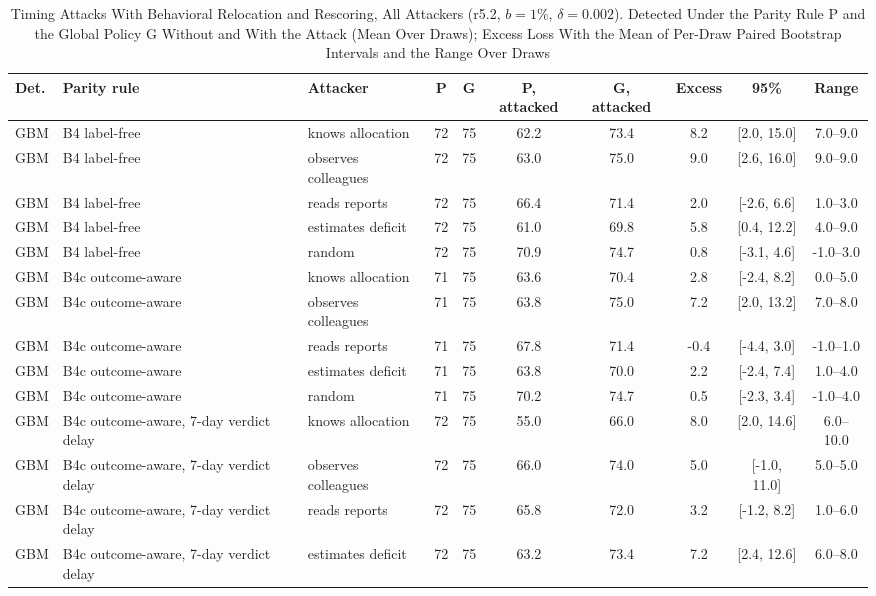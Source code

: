 \documentclass[10pt,onecolumn,letterpaper]{article}
\begin{document}
\begin{table}[!t]
\caption{Timing Attacks With Behavioral Relocation and Rescoring, All Attackers (r5.2, $b=1\%$, $\delta=0.002$). Detected Under the Parity Rule P and the Global Policy G Without and With the Attack (Mean Over Draws); Excess Loss With the Mean of Per-Draw Paired Bootstrap Intervals and the Range Over Draws\label{tab:e-l1-r52}}
\centering
\scriptsize
\setlength{\tabcolsep}{3pt}
\begin{tabular}{lllccccccc}
\toprule
Det. & Parity rule & Attacker & P & G & P, attacked & G, attacked & Excess & 95\% & Range \\
\midrule
GBM & B4 label-free & knows allocation & 72 & 75 & 62.2 & 73.4 & 8.2 & [2.0, 15.0] & 7.0--9.0 \\
GBM & B4 label-free & observes colleagues & 72 & 75 & 63.0 & 75.0 & 9.0 & [2.6, 16.0] & 9.0--9.0 \\
GBM & B4 label-free & reads reports & 72 & 75 & 66.4 & 71.4 & 2.0 & [-2.6, 6.6] & 1.0--3.0 \\
GBM & B4 label-free & estimates deficit & 72 & 75 & 61.0 & 69.8 & 5.8 & [0.4, 12.2] & 4.0--9.0 \\
GBM & B4 label-free & random & 72 & 75 & 70.9 & 74.7 & 0.8 & [-3.1, 4.6] & -1.0--3.0 \\
GBM & B4c outcome-aware & knows allocation & 71 & 75 & 63.6 & 70.4 & 2.8 & [-2.4, 8.2] & 0.0--5.0 \\
GBM & B4c outcome-aware & observes colleagues & 71 & 75 & 63.8 & 75.0 & 7.2 & [2.0, 13.2] & 7.0--8.0 \\
GBM & B4c outcome-aware & reads reports & 71 & 75 & 67.8 & 71.4 & -0.4 & [-4.4, 3.0] & -1.0--1.0 \\
GBM & B4c outcome-aware & estimates deficit & 71 & 75 & 63.8 & 70.0 & 2.2 & [-2.4, 7.4] & 1.0--4.0 \\
GBM & B4c outcome-aware & random & 71 & 75 & 70.2 & 74.7 & 0.5 & [-2.3, 3.4] & -1.0--4.0 \\
GBM & B4c outcome-aware, 7-day verdict delay & knows allocation & 72 & 75 & 55.0 & 66.0 & 8.0 & [2.0, 14.6] & 6.0--10.0 \\
GBM & B4c outcome-aware, 7-day verdict delay & observes colleagues & 72 & 75 & 66.0 & 74.0 & 5.0 & [-1.0, 11.0] & 5.0--5.0 \\
GBM & B4c outcome-aware, 7-day verdict delay & reads reports & 72 & 75 & 65.8 & 72.0 & 3.2 & [-1.2, 8.2] & 1.0--6.0 \\
GBM & B4c outcome-aware, 7-day verdict delay & estimates deficit & 72 & 75 & 63.2 & 73.4 & 7.2 & [2.4, 12.6] & 6.0--8.0 \\

\end{tabular}
\end{table}
\end{document}
